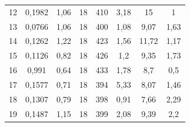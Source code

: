\documentclass[12pt,a4paper]{article}
\begin{document}
\begin{table}[]
{\begin{tabular}{|c|c|c|c|c|c|c|c|}
    12                       & 0,1982                 & 1,06                       & 18                                         & 410                       & 3,18                                            & 15                                       & 1                                     \\
    13                       & 0,0766                 & 1,06                       & 18                                         & 400                       & 1,08                                            & 9,07                                     & 1,63                                  \\
    14                       & 0,1262                 & 1,22                       & 18                                         & 423                       & 1,56                                            & 11,72                                    & 1,17                                  \\
    15                       & 0,1126                 & 0,82                       & 18                                         & 426                       & 1,2                                             & 9,35                                     & 1,73                                  \\
    16                       & 0,991                  & 0,64                       & 18                                         & 433                       & 1,78                                            & 8,7                                      & 0,5                                   \\
    17                       & 0,1577                 & 0,71                       & 18                                         & 394                       & 5,33                                            & 8,07                                     & 1,46                                  \\
    18                       & 0,1307                 & 0,79                       & 18                                         & 398                       & 0,91                                            & 7,66                                     & 2,29                                  \\
    19                       & 0,1487                 & 1,15                       & 18                                         & 399                       & 2,08                                            & 9,39                                     & 2,2                                   \\

\end{tabular}}
\end{table}
\end{document}
